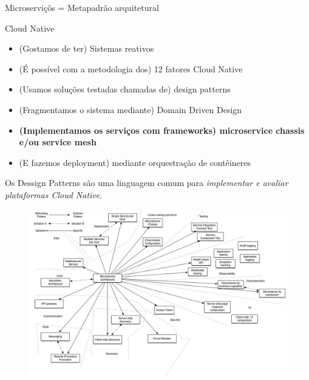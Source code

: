 \documentclass[aspectratio=169]{beamer}
\begin{document}
\begin{frame}{Microserviçõs = Metapadrão arquitetural}

    Cloud Native
	\begin{itemize}
		\item (Gostamos de ter) Sistemas reativos
		\item (É possível com a metodologia dos) 12 fatores Cloud Native
        \item (Usamos soluções testadas chamadas de) design patterns
        \item (Fragmentamos o sistema mediante) Domain Driven Design
		\item \textbf{(Implementamos os serviços com frameworks) microservice chassis e/ou service mesh}
        \item (E fazemos deployment) mediante orquestração de contêineres
	\end{itemize}

    Os Dessign Patterns são uma linguagem comum para \textit{implementar e avaliar plataformas Cloud Native}.

\end{frame}


\begin{frame}{}
\begin{figure}
	\centering
	\includegraphics[width=\linewidth]{Images/PatternsRelatedToMicroservices}
\end{figure}
\end{frame}
\end{document}
